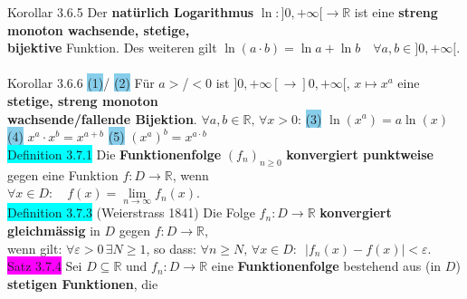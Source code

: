 \documentclass[10pt]{article}
\begin{document}
\colorbox{BurntOrange}{Korollar 3.6.5} Der \textbf{natürlich Logarithmus} 
                $\ln:]0,+\infty[\longrightarrow\mathbb{R}$ ist eine \textbf{streng monoton 
                wachsende, stetige, \\
        \indent bijektive} Funktion. Des weiteren gilt 
                \textcolor{NavyBlue}{$\ln(a\cdot b)=\ln a+\ln b\quad\forall a,b\in]0,+\infty[$}.\\
\,\\
\colorbox{BurntOrange}{Korollar 3.6.6} \colorbox{SkyBlue}{(1)}/
                \colorbox{SkyBlue}{(2)} Für \textcolor{NavyBlue}{$a>$/$<0$} 
                ist \textcolor{NavyBlue}{
                $]0,+\infty[\longrightarrow]0,+\infty[,\,x\longmapsto x^a$}
                eine \textbf{stetige, streng monoton \\
        \indent wachsende/fallende Bijektion}. 
                \textcolor{NavyBlue}{$\forall a,b\in\mathbb{R},\,\forall x>0$}: 
                \colorbox{SkyBlue}{(3)} \textcolor{NavyBlue}{$\ln(x^a)=a\ln(x)$}
                \colorbox{SkyBlue}{(4)} \textcolor{NavyBlue}{$x^a\cdot x^b=x^{a+b}$}
                \colorbox{SkyBlue}{(5)} \textcolor{NavyBlue}{$(x^a)^b=x^{a\cdot b}$}\\
\colorbox{cyan}{Definition 3.7.1} Die \textbf{Funktionenfolge} 
                \textcolor{NavyBlue}{$(f_n)_{n\geqslant0}$}
                \textbf{konvergiert punktweise} gegen eine Funktion
                \textcolor{NavyBlue}{$f:D\longrightarrow\mathbb{R}$}, wenn \\
        \indent \textcolor{NavyBlue}{
                $\forall x\in D:\quad f(x)=\lim\limits_{n\to\infty}f_n(x)$}.\\
\colorbox{cyan}{Definition 3.7.3} (Weierstrass 1841) Die Folge 
                \textcolor{NavyBlue}{$f_n:D\longrightarrow\mathbb{R}$} 
                \textbf{konvergiert gleichmässig} in 
                \textcolor{NavyBlue}{$D$} gegen 
                \textcolor{NavyBlue}{$f:D\longrightarrow\mathbb{R}$}, \\
        \indent wenn gilt: 
                \textcolor{NavyBlue}{$\forall\varepsilon>0\,\exists N\geqslant1$}, so dass: 
                \textcolor{NavyBlue}{
                $\forall n\geqslant N,\,\forall x\in D:\enspace |f_n(x)-f(x)|<\varepsilon$}.\\
\colorbox{magenta}{Satz 3.7.4} Sei \textcolor{NavyBlue}{$D\subseteq\mathbb{R}$} und 
                \textcolor{NavyBlue}{$f_n:D\longrightarrow\mathbb{R}$} 
                eine \textbf{Funktionenfolge} bestehend aus 
                (in $D$) \textbf{stetigen Funktionen}, die \\
\end{document}
